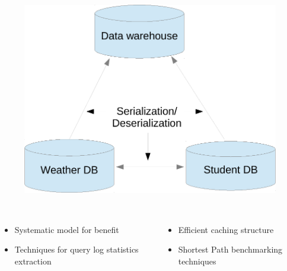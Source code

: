 \begin{frame}[color=red] %
    \begin{figure}
    \includegraphics[width=1.05\textwidth]{figures/placeholder.pdf} 
    \
    \end{figure}

\begin{columns}
  \begin{column}{0.5\textwidth}
    \vspace{-0.8em}
    \begin{itemize}
    \itemsep -2pt
      \item Systematic model for benefit
      \item Techniques for query log statistics extraction 
    \end{itemize}
  \end{column}
  \begin{column}{0.6\textwidth}
    \vspace{-1.3em}
    \begin{itemize}
     \itemsep -2pt
      \item Efficient caching structure
      \item Shortest Path benchmarking techniques
    \end{itemize}
  \end{column}
\end{columns}
\end{frame}




